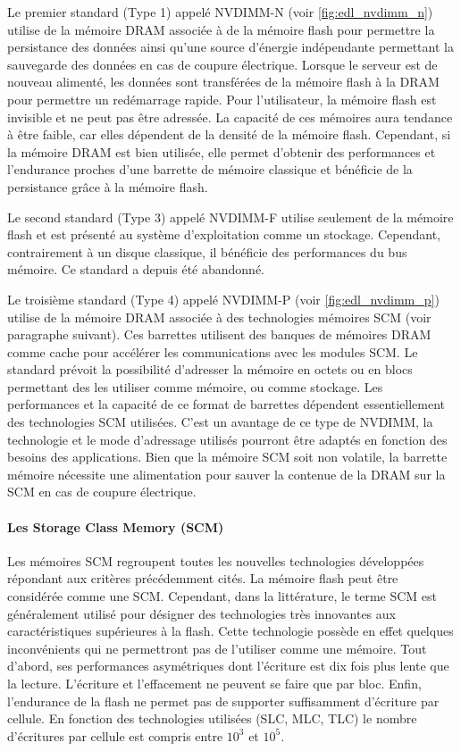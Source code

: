         Le premier standard (Type 1) appelé NVDIMM-N (voir \autoref{fig:edl_nvdimm_n}) utilise de la mémoire DRAM associée à de la mémoire flash pour permettre la persistance des données ainsi qu'une source d'énergie indépendante permettant la sauvegarde des données en cas de coupure électrique. Lorsque le serveur est de nouveau alimenté, les données sont transférées de la mémoire flash à la DRAM pour permettre un redémarrage rapide. Pour l'utilisateur, la mémoire flash est invisible et ne peut pas être adressée. La capacité de ces mémoires aura tendance à être faible, car elles dépendent de la densité de la mémoire flash. Cependant, si la mémoire DRAM est bien utilisée, elle permet d'obtenir des performances et l'endurance proches d'une barrette de mémoire classique et bénéficie de la persistance grâce à la mémoire flash. 
            
        Le second standard (Type 3) appelé NVDIMM-F utilise seulement de la mémoire flash et est présenté au système d'exploitation comme un stockage. Cependant, contrairement à un disque classique, il bénéficie des performances du bus mémoire. Ce standard a depuis été abandonné. 
        
        Le troisième standard (Type 4) appelé NVDIMM-P (voir \autoref{fig:edl_nvdimm_p}) utilise de la mémoire DRAM associée à des technologies mémoires SCM (voir paragraphe suivant). Ces barrettes utilisent des banques de mémoires DRAM comme cache pour accélérer les communications avec les modules SCM. Le standard prévoit la possibilité d'adresser la mémoire en octets ou en blocs permettant des les utiliser comme mémoire, ou comme stockage. Les performances et la capacité de ce format de barrettes dépendent essentiellement des technologies SCM utilisées. C'est un avantage de ce type de NVDIMM, la technologie et le mode d'adressage utilisés pourront être adaptés en fonction des besoins des applications. Bien que la mémoire SCM soit non volatile, la barrette mémoire nécessite une alimentation pour sauver la contenue de la DRAM sur la SCM en cas de coupure électrique.

    \paragraph{Les Storage Class Memory (SCM)}\label{sec:SCM}
    
        Les mémoires SCM regroupent toutes les nouvelles technologies développées répondant aux critères précédemment cités. La mémoire flash peut être considérée comme une SCM. Cependant, dans la littérature, le terme SCM est généralement utilisé pour désigner des technologies très innovantes aux caractéristiques supérieures à la flash. Cette technologie possède en effet quelques inconvénients qui ne permettront pas de l'utiliser comme une mémoire. Tout d'abord, ses performances asymétriques dont l'écriture est dix fois plus lente que la lecture. L'écriture et l'effacement ne peuvent se faire que par bloc. Enfin, l'endurance de la flash ne permet pas de supporter suffisamment d'écriture par cellule. En fonction des technologies utilisées (SLC, MLC, TLC) le nombre d'écritures par cellule est compris entre $10^3$ et $10^5$.  
        
